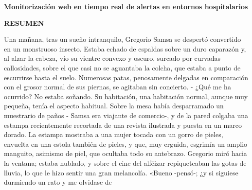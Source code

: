 \begin{center}
{\Large \bfseries Monitorización web en tiempo real de alertas en entornos hospitalarios}

\vspace{1cm}
{\Large \bfseries RESUMEN}

\end{center}


Una mañana, tras un sueño intranquilo, Gregorio Samsa se despertó convertido en un monstruoso insecto. Estaba echado de espaldas sobre un duro caparazón y, al alzar la cabeza, vio su vientre convexo y oscuro, surcado por curvadas callosidades, sobre el que casi no se aguantaba la colcha, que estaba a punto de escurrirse hasta el suelo. Numerosas patas, penosamente delgadas en comparación con el grosor normal de sus piernas, se agitaban sin concierto. - ¿Qué me ha ocurrido? No estaba soñando. Su habitación, una habitación normal, aunque muy pequeña, tenía el aspecto habitual. Sobre la mesa había desparramado un muestrario de paños - Samsa era viajante de comercio-, y de la pared colgaba una estampa recientemente recortada de una revista ilustrada y puesta en un marco dorado. La estampa mostraba a una mujer tocada con un gorro de pieles, envuelta en una estola también de pieles, y que, muy erguida, esgrimía un amplio manguito, asimismo de piel, que ocultaba todo su antebrazo. Gregorio miró hacia la ventana; estaba nublado, y sobre el cinc del alféizar repiqueteaban las gotas de lluvia, lo que le hizo sentir una gran melancolía. «Bueno -pensó-; ¿y si siguiese durmiendo un rato y me olvidase de